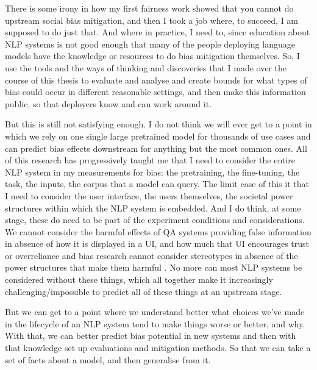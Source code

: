 There is some irony in how my first fairness work showed that you cannot do upstream social bias mitigation, and then I took a job where, to succeed, I am supposed to do just that. And where in practice, I need to, since education about NLP systems is not good enough that many of the people deploying language models have the knowledge or resources to do bias mitigation themselves. So, I use the tools and the ways of thinking and discoveries that I made over the course of this thesis to evaluate and analyse and create bounds for what types of bias could occur in different reasonable settings, and then make this information public, so that deployers know and can work around it. 

But this is still not satisfying enough. I do not think we will ever get to a point in which we rely on one single large pretrained model for thousands of use cases and can predict bias effects downstream for anything but the most common ones. All of this research has progressively taught me that I need to consider the entire NLP system in my measurements for bias: the pretraining, the fine-tuning, the task, the inputs, the corpus that a model can query. The limit case of this it that I need to consider the user interface, the users themselves, the societal power structures within which the NLP system is embedded. And I do think, at some stage, these do need to be part of the experiment conditions and considerations. We cannot consider the harmful effects of QA systems providing false information in absence of how it is displayed in a UI, and how much that UI encourages trust or overreliance \citep{} and bias research cannot consider stereotypes in absence of the power structures that make them harmful \citep{blodgett-etal-2021-stereotyping}. No more can most NLP systems be considered without these things, which all together make it increasingly challenging/impossible to predict all of these things at an upstream stage. 

But we can get to a point where we understand better what choices we've made in the lifecycle of an NLP system tend to make things worse or better, and why. With that, we can better predict bias potential in new systems and then with that knowledge set up evaluations and mitigation methods. So that we can take a set of facts about a model, and then generalise from it. %













